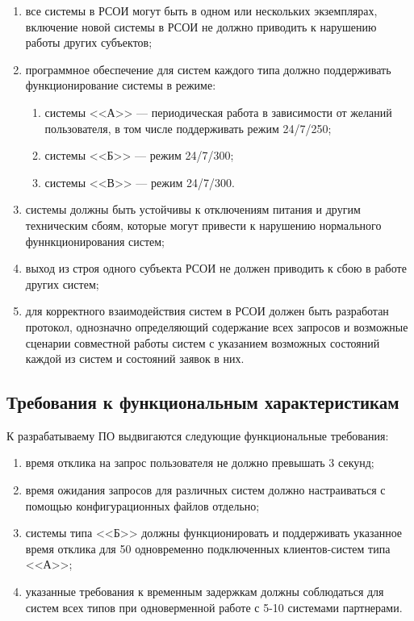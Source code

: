  \begin{enumerate}
 	\item все системы в РСОИ могут быть в одном или нескольких экземплярах, включение новой системы в РСОИ не должно приводить к нарушению работы других субъектов;
 	\item программное обеспечение для систем каждого типа должно 	поддерживать функционирование системы в режиме:
 		\begin{enumerate}
 			\item системы <<А>> --- периодическая работа в зависимости от желаний пользователя, в том числе поддерживать режим 24/7/250;
 			\item системы <<Б>> --- режим 24/7/300;
 			\item системы <<В>> --- режим 24/7/300.
 		\end{enumerate}
 	\item системы должны быть устойчивы к отключениям питания и другим техническим сбоям, которые могут привести к нарушению нормального фуннкционирования систем;
 	\item выход из строя одного субъекта РСОИ не должен приводить к сбою в работе других систем;
 	\item для корректного взаимодействия систем в РСОИ должен быть разработан протокол, однозначно определяющий содержание всех запросов и возможные сценарии совместной работы систем с указанием возможных состояний каждой из систем и состояний заявок в них.
 \end{enumerate}

 \subsection{Требования к функциональным характеристикам}
 К разрабатываему ПО выдвигаются следующие функциональные требования:
 \begin{enumerate}
 	\item время отклика на запрос пользователя не должно превышать 3 секунд;
 	\item время ожидания запросов для различных систем должно настраиваться с помощью конфигурационных файлов отдельно;
 	\item системы типа <<Б>> должны функционировать и поддерживать указанное время отклика для 50 одновременно подключенных клиентов-систем типа <<А>>;
 	\item указанные требования к временным задержкам должны соблюдаться для систем всех типов при одноверменной работе с 5-10 системами партнерами.
 \end{enumerate}

